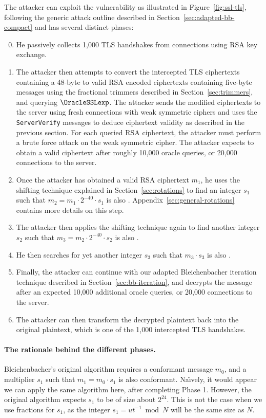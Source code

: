 The attacker can exploit the \ssltwo vulnerability as illustrated in Figure~\ref{fig:ssl-tls}, following the generic attack outline described in Section~\ref{sec:adapted-bb-compact} and has several distinct phases:
\begin{enumerate}
 \setcounter{enumi}{-1}
	\item He passively collects 1,000 TLS handshakes from connections using RSA key exchange.
	\item The attacker then attempts to convert the intercepted TLS ciphertexts containing a 48-byte \pms to valid RSA \PKCS encoded ciphertexts containing five-byte messages using the fractional trimmers described in Section~\ref{sec:trimmers}, and querying $\OracleSSLexp$. The attacker sends the modified ciphertexts to the server using fresh \ssltwo connections with weak symmetric ciphers and uses the \texttt{ServerVerify} messages to deduce ciphertext validity as described in the previous section. For each queried RSA ciphertext, the attacker must perform a brute force attack on the weak symmetric cipher. The attacker expects to obtain a valid \ssltwo ciphertext after roughly 10,000 oracle queries, or 20,000 connections to the server.
	\item Once the attacker has obtained a valid \ssltwo RSA ciphertext $m_1$, he uses the shifting technique explained in Section~\ref{sec:rotations} to find an integer $s_1$ such that $m_2 = m_1 \cdot 2^{-40} \cdot s_1$ is also \sslconform.  Appendix~\ref{sec:general-rotations} contains more details on this step.
	\item The attacker then applies the shifting technique again to find another integer $s_2$ such that
		$m_3 = m_2 \cdot 2^{-40} \cdot s_2$ is also \sslconform.
	\item He then searches for yet another integer $s_3$ such that $m_3 \cdot s_3$ is also \sslconform.
	\item Finally, the attacker can continue with our adapted Bleichenbacher iteration technique described in Section~\ref{sec:bb-iteration}, and decrypts the message after an expected 10,000 additional oracle queries, or 20,000 connections to the server.
	\item The attacker can then transform the decrypted plaintext back into the original plaintext, which is one of the 1,000 intercepted TLS handshakes.
\end{enumerate}

\paragraph{The rationale behind the different phases.}
Bleichenbacher's original algorithm requires a conformant message $m_0$, and a multiplier $s_1$ such that $m_1 = m_0 \cdot s_1$ is also conformant.
Na\"{\i}vely, it would appear we can apply the same algorithm here, after completing Phase 1.
However, the original algorithm expects $s_1$ to be of size about $2^{24}$. This is not the case when we use fractions for $s_1$, as the integer $s_1 = u t^{-1} \bmod N$ will be the same size as $N$.

